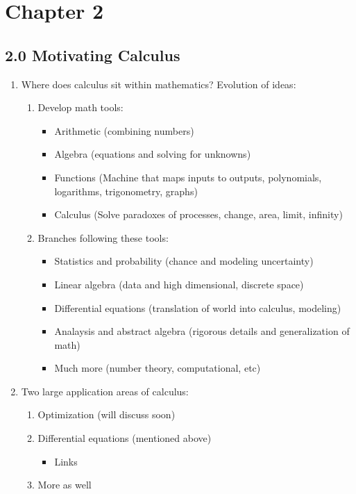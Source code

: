 \documentclass{article}
\begin{document}
\section{Chapter 2}
\subsection{2.0 Motivating Calculus}

\begin{enumerate}
\item Where does calculus sit within mathematics? Evolution of ideas:
\begin{enumerate}
\item Develop math tools:
\begin{itemize}
\item Arithmetic (combining numbers)
\item Algebra (equations and solving for unknowns)
\item Functions (Machine that maps inputs to outputs, polynomials, logarithms, trigonometry, graphs)
\item Calculus (Solve paradoxes of processes, change, area, limit, infinity)
\end{itemize}
\item Branches following these tools:
\begin{itemize}
\item Statistics and probability (chance and modeling uncertainty)
\item Linear algebra (data and high dimensional, discrete space)
\item Differential equations (translation of world into calculus, modeling)
\item Analaysis and abstract algebra (rigorous details and generalization of math)
\item Much more (number theory, computational, etc)
\end{itemize}
\end{enumerate}

\item Two large application areas of calculus:
\begin{enumerate}
\item Optimization (will discuss soon)
\item Differential equations (mentioned above)
\begin{itemize}
\item Links
\end{itemize}
\item More as well
\end{enumerate}


\end{enumerate}
\end{document}
